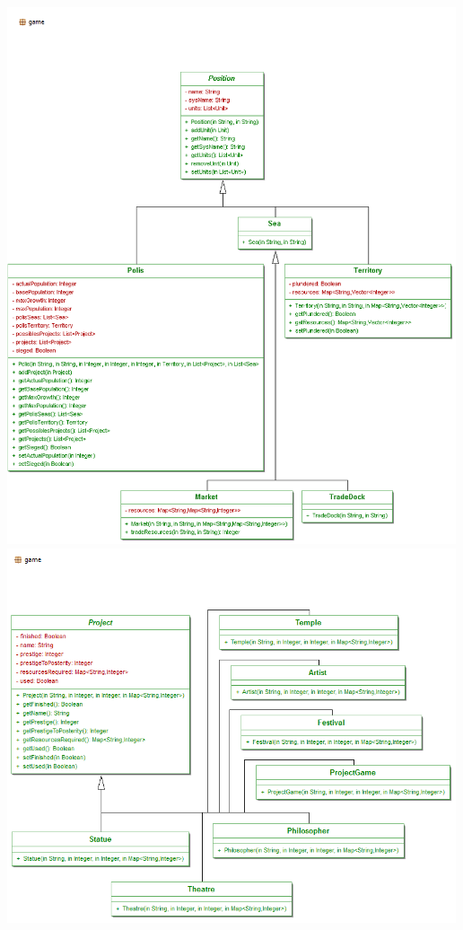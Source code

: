 \documentclass[11 pt]{book}
\begin{document}
\begin{center}
        \includegraphics[width=500px]{design-uml/game-positions.png}
        \includegraphics[width=500px]{design-uml/game-projects.png}

\end{center}
\end{document}
